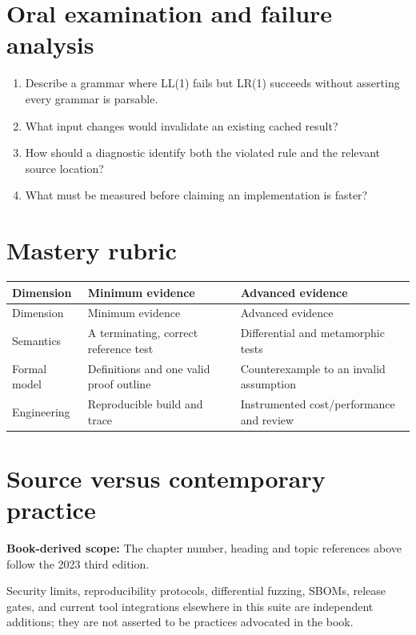 \documentclass[10pt,letterpaper]{article}
\begin{document}
\section{Oral examination and failure analysis}
\begin{enumerate}
\item Describe a grammar where LL(1) fails but LR(1) succeeds without asserting every grammar is parsable.
\item What input changes would invalidate an existing cached result?
\item How should a diagnostic identify both the violated rule and the relevant source location?
\item What must be measured before claiming an implementation is faster?
\end{enumerate}

\section{Mastery rubric}
\begin{longtable}{|>{\raggedright\arraybackslash}p{}|>{\raggedright\arraybackslash}p{}|>{\raggedright\arraybackslash}p{}|}
\hline
Dimension & Minimum evidence & Advanced evidence\\ \hline\endfirsthead
\hline
Dimension & Minimum evidence & Advanced evidence\\ \hline\endhead
Semantics & A terminating, correct reference test & Differential and metamorphic tests\\ \hline
Formal model & Definitions and one valid proof outline & Counterexample to an invalid assumption\\ \hline
Engineering & Reproducible build and trace & Instrumented cost/performance and review\\ \hline
\end{longtable}

\section{Source versus contemporary practice}
\textbf{Book-derived scope:} The chapter number, heading and topic references above follow the 2023 third edition.\par\modern Security limits, reproducibility protocols, differential fuzzing, SBOMs, release gates, and current tool integrations elsewhere in this suite are independent additions; they are not asserted to be practices advocated in the book.
\end{document}
